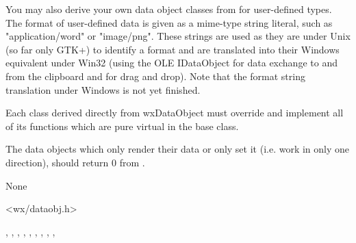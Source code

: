 You may also derive your own data object classes from 
 for user-defined types. The
format of user-defined data is given as a mime-type string literal, such as
"application/word" or "image/png". These strings are used as they are under
Unix (so far only GTK+) to identify a format and are translated into their
Windows equivalent under Win32 (using the OLE IDataObject for data exchange to
and from the clipboard and for drag and drop). Note that the format string
translation under Windows is not yet finished.




Each class derived directly from wxDataObject must override and implement all
of its functions which are pure virtual in the base class.

The data objects which only render their data or only set it (i.e. work in
only one direction), should return 0 from 
.


None


<wx/dataobj.h>




, 
, 
, 
, 
, 
, 
, 
, 
, 


\label{wxdataobjectwxdataobject}


